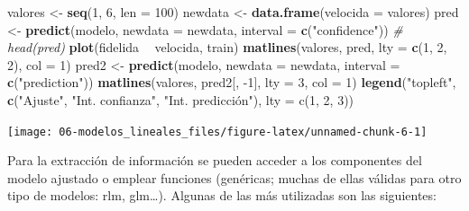 \documentclass[
]{book}
\newenvironment{Shaded}{\begin{snugshade}}{\end{snugshade}}
\newcommand{\CommentTok}[1]{\textcolor[rgb]{0.56,0.35,0.01}{\textit{#1}}}
\newcommand{\DataTypeTok}[1]{\textcolor[rgb]{0.13,0.29,0.53}{#1}}
\newcommand{\DecValTok}[1]{\textcolor[rgb]{0.00,0.00,0.81}{#1}}
\newcommand{\KeywordTok}[1]{\textcolor[rgb]{0.13,0.29,0.53}{\textbf{#1}}}
\newcommand{\NormalTok}[1]{#1}
\newcommand{\OperatorTok}[1]{\textcolor[rgb]{0.81,0.36,0.00}{\textbf{#1}}}
\newcommand{\StringTok}[1]{\textcolor[rgb]{0.31,0.60,0.02}{#1}}
\theoremstyle{break}
\theoremstyle{definition}
\theoremstyle{definition}
\theoremstyle{definition}
\theoremstyle{remark}
\begin{document}
\begin{Shaded}
\begin{Highlighting}[]
\NormalTok{valores <-}\StringTok{ }\KeywordTok{seq}\NormalTok{(}\DecValTok{1}\NormalTok{, }\DecValTok{6}\NormalTok{, }\DataTypeTok{len =} \DecValTok{100}\NormalTok{)}
\NormalTok{newdata <-}\StringTok{ }\KeywordTok{data.frame}\NormalTok{(}\DataTypeTok{velocida =}\NormalTok{ valores)}
\NormalTok{pred <-}\StringTok{ }\KeywordTok{predict}\NormalTok{(modelo, }\DataTypeTok{newdata =}\NormalTok{ newdata, }\DataTypeTok{interval =} \KeywordTok{c}\NormalTok{(}\StringTok{"confidence"}\NormalTok{))}
\CommentTok{# head(pred)}
\KeywordTok{plot}\NormalTok{(fidelida }\OperatorTok{~}\StringTok{ }\NormalTok{velocida, train)}
\KeywordTok{matlines}\NormalTok{(valores, pred, }\DataTypeTok{lty =} \KeywordTok{c}\NormalTok{(}\DecValTok{1}\NormalTok{, }\DecValTok{2}\NormalTok{, }\DecValTok{2}\NormalTok{), }\DataTypeTok{col =} \DecValTok{1}\NormalTok{)}
\NormalTok{pred2 <-}\StringTok{ }\KeywordTok{predict}\NormalTok{(modelo, }\DataTypeTok{newdata =}\NormalTok{ newdata, }\DataTypeTok{interval =} \KeywordTok{c}\NormalTok{(}\StringTok{"prediction"}\NormalTok{))}
\KeywordTok{matlines}\NormalTok{(valores, pred2[, }\DecValTok{-1}\NormalTok{], }\DataTypeTok{lty =} \DecValTok{3}\NormalTok{, }\DataTypeTok{col =} \DecValTok{1}\NormalTok{)}
\KeywordTok{legend}\NormalTok{(}\StringTok{"topleft"}\NormalTok{, }\KeywordTok{c}\NormalTok{(}\StringTok{"Ajuste"}\NormalTok{, }\StringTok{"Int. confianza"}\NormalTok{, }\StringTok{"Int. predicción"), lty = c(1, 2, 3))}
\end{Highlighting}
\end{Shaded}

\begin{center}\texttt{[image: 06-modelos\_lineales\_files/figure-latex/unnamed-chunk-6-1]} \end{center}

Para la extracción de información se pueden acceder a los componentes del modelo ajustado o emplear funciones (genéricas; muchas de ellas válidas para otro tipo de modelos: rlm, glm\ldots).
Algunas de las más utilizadas son las siguientes:
\end{document}
